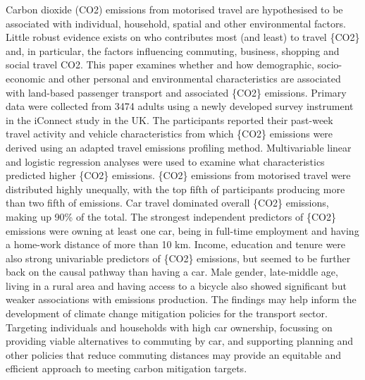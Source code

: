 Carbon dioxide (CO2) emissions from motorised travel are hypothesised to be associated with individual, household, spatial and other environmental factors. Little robust evidence exists on who contributes most (and least) to travel \{CO2\} and, in particular, the factors influencing commuting, business, shopping and social travel CO2. This paper examines whether and how demographic, socio-economic and other personal and environmental characteristics are associated with land-based passenger transport and associated \{CO2\} emissions. Primary data were collected from 3474 adults using a newly developed survey instrument in the iConnect study in the UK. The participants reported their past-week travel activity and vehicle characteristics from which \{CO2\} emissions were derived using an adapted travel emissions profiling method. Multivariable linear and logistic regression analyses were used to examine what characteristics predicted higher \{CO2\} emissions. \{CO2\} emissions from motorised travel were distributed highly unequally, with the top fifth of participants producing more than two fifth of emissions. Car travel dominated overall \{CO2\} emissions, making up 90\% of the total. The strongest independent predictors of \{CO2\} emissions were owning at least one car, being in full-time employment and having a home-work distance of more than 10 km. Income, education and tenure were also strong univariable predictors of \{CO2\} emissions, but seemed to be further back on the causal pathway than having a car. Male gender, late-middle age, living in a rural area and having access to a bicycle also showed significant but weaker associations with emissions production. The findings may help inform the development of climate change mitigation policies for the transport sector. Targeting individuals and households with high car ownership, focussing on providing viable alternatives to commuting by car, and supporting planning and other policies that reduce commuting distances may provide an equitable and efficient approach to meeting carbon mitigation targets.